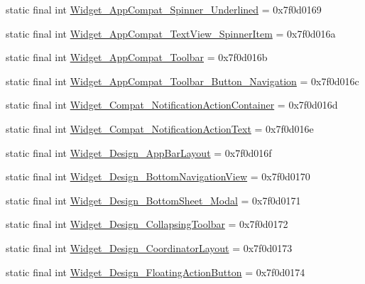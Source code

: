 \begin{DoxyCompactItemize}
static final int \mbox{\hyperlink{classandroid_1_1support_1_1design_1_1_r_1_1style_acef1f548c2829a2ec8d901c69e71a2e8}{Widget\+\_\+\+App\+Compat\+\_\+\+Spinner\+\_\+\+Underlined}} = 0x7f0d0169
\item 
static final int \mbox{\hyperlink{classandroid_1_1support_1_1design_1_1_r_1_1style_a312f7d2acedfe37ba69323b72be9ac8f}{Widget\+\_\+\+App\+Compat\+\_\+\+Text\+View\+\_\+\+Spinner\+Item}} = 0x7f0d016a
\item 
static final int \mbox{\hyperlink{classandroid_1_1support_1_1design_1_1_r_1_1style_acf5c2e90e5ec401cf8befb6708bdfe1b}{Widget\+\_\+\+App\+Compat\+\_\+\+Toolbar}} = 0x7f0d016b
\item 
static final int \mbox{\hyperlink{classandroid_1_1support_1_1design_1_1_r_1_1style_a6f721ee1613805b7fdb270545f575576}{Widget\+\_\+\+App\+Compat\+\_\+\+Toolbar\+\_\+\+Button\+\_\+\+Navigation}} = 0x7f0d016c
\item 
static final int \mbox{\hyperlink{classandroid_1_1support_1_1design_1_1_r_1_1style_abba9b87176bec9a05b6acfb262fda062}{Widget\+\_\+\+Compat\+\_\+\+Notification\+Action\+Container}} = 0x7f0d016d
\item 
static final int \mbox{\hyperlink{classandroid_1_1support_1_1design_1_1_r_1_1style_a0686d695152f8ea685158d719675235e}{Widget\+\_\+\+Compat\+\_\+\+Notification\+Action\+Text}} = 0x7f0d016e
\item 
static final int \mbox{\hyperlink{classandroid_1_1support_1_1design_1_1_r_1_1style_ac05746c2babe4cc3601d558ffdf6806d}{Widget\+\_\+\+Design\+\_\+\+App\+Bar\+Layout}} = 0x7f0d016f
\item 
static final int \mbox{\hyperlink{classandroid_1_1support_1_1design_1_1_r_1_1style_a7692f87a9f20e874e0c34fb9a776dcc0}{Widget\+\_\+\+Design\+\_\+\+Bottom\+Navigation\+View}} = 0x7f0d0170
\item 
static final int \mbox{\hyperlink{classandroid_1_1support_1_1design_1_1_r_1_1style_a25675d420751beca4e7777b3b4f3a6ff}{Widget\+\_\+\+Design\+\_\+\+Bottom\+Sheet\+\_\+\+Modal}} = 0x7f0d0171
\item 
static final int \mbox{\hyperlink{classandroid_1_1support_1_1design_1_1_r_1_1style_ad5b861aa8579d0792ab299950a7e5203}{Widget\+\_\+\+Design\+\_\+\+Collapsing\+Toolbar}} = 0x7f0d0172
\item 
static final int \mbox{\hyperlink{classandroid_1_1support_1_1design_1_1_r_1_1style_a29eed8aef81e32c9973e6dfcacb41857}{Widget\+\_\+\+Design\+\_\+\+Coordinator\+Layout}} = 0x7f0d0173
\item 
static final int \mbox{\hyperlink{classandroid_1_1support_1_1design_1_1_r_1_1style_a08935d376825ff3b7d17aec27397cf9d}{Widget\+\_\+\+Design\+\_\+\+Floating\+Action\+Button}} = 0x7f0d0174

\end{DoxyCompactItemize}
